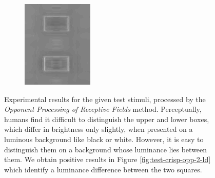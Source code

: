 \documentclass[journal,onecolumn]{IEEEtran}
\begin{document}
{\begin{figure}[H]
\begin{subfigure}[b]{0.2\textwidth}
            \caption{}
            \label{fig:test-crisp-opp-2-by}
    \end{subfigure}%
    \begin{subfigure}[b]{0.2\textwidth}
            \centering
            \includegraphics[width=.85\linewidth, frame]{test-crisp-opp-3-by}
            \caption{}
            \label{fig:test-crisp-opp-3-by}
    \end{subfigure}
    \caption{Experimental results for the given test stimuli, processed by the \textit{Opponent Processing of Receptive Fields} method. Perceptually, humans find it difficult to distinguish the upper and lower boxes, which differ in brightness only slightly, when presented on a luminous background like black or white. However, it is easy to distinguish them on a background whose luminance lies between them. We obtain positive results in Figure \ref{fig:test-crisp-opp-2-ld} which identify a luminance difference between the two squares.}
\end{figure}
\clearpage
}
\end{document}
